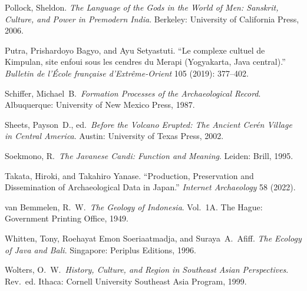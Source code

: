 \documentclass[12pt,a4paper]{article}
\begin{document}
\vspace{0.5em}
\noindent Pollock, Sheldon. \emph{The Language of the Gods in the World of Men: Sanskrit, Culture, and Power in Premodern India}. Berkeley: University of California Press, 2006.

\vspace{0.5em}
\noindent Putra, Prishardoyo Bagyo, and Ayu Setyastuti. ``Le complexe cultuel de Kimpulan, site enfoui sous les cendres du Merapi (Yogyakarta, Java central).'' \emph{Bulletin de l'\'{E}cole fran\c{c}aise d'Extr\^{e}me-Orient} 105 (2019): 377--402.

\vspace{0.5em}
\noindent Schiffer, Michael~B.\ \emph{Formation Processes of the Archaeological Record}. Albuquerque: University of New Mexico Press, 1987.

\vspace{0.5em}
\noindent Sheets, Payson~D., ed.\ \emph{Before the Volcano Erupted: The Ancient Cer\'{e}n Village in Central America}. Austin: University of Texas Press, 2002.

\vspace{0.5em}
\noindent Soekmono, R.\ \emph{The Javanese Candi: Function and Meaning}. Leiden: Brill, 1995.

\vspace{0.5em}
\noindent Takata, Hiroki, and Takahiro Yanase. ``Production, Preservation and Dissemination of Archaeological Data in Japan.'' \emph{Internet Archaeology} 58 (2022).

\vspace{0.5em}
\noindent van Bemmelen, R.~W.\ \emph{The Geology of Indonesia}. Vol.~1A. The Hague: Government Printing Office, 1949.

\vspace{0.5em}
\noindent Whitten, Tony, Roehayat Emon Soeriaatmadja, and Suraya~A.\ Afiff. \emph{The Ecology of Java and Bali}. Singapore: Periplus Editions, 1996.

\vspace{0.5em}
\noindent Wolters, O.~W.\ \emph{History, Culture, and Region in Southeast Asian Perspectives}. Rev.\ ed. Ithaca: Cornell University Southeast Asia Program, 1999.
\end{document}
